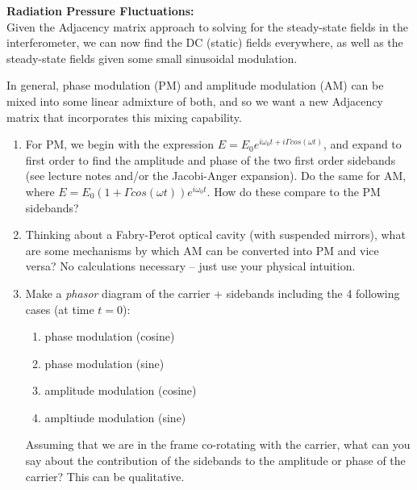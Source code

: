\item \textbf{Radiation Pressure Fluctuations:} \\

  Given the Adjacency matrix approach to solving for the steady-state fields in the interferometer, we can now find the DC (static) fields everywhere, as well as the steady-state fields given some small sinusoidal modulation.


  In general, phase modulation (PM) and amplitude modulation (AM) can be mixed into some linear admixture of both, and so we want a new Adjacency matrix that incorporates this mixing capability.

  \begin{enumerate}

  \item For PM, we begin with the expression $E = E_0 e^{i \omega_0 t + i \Gamma cos(\omega t)}$, and expand to first order to find the amplitude and phase of the two first order sidebands (see lecture notes and/or the Jacobi-Anger expansion). Do the same for AM, where $E = E_0 (1 + \Gamma cos(\omega t)) e^{i \omega_0 t}$. How do these compare to the PM sidebands?

  \item Thinking about a Fabry-Perot optical cavity (with suspended mirrors), what are some mechanisms by which AM can be converted into PM and vice versa? No calculations necessary -- just use your physical intuition.

  \item Make a \emph{phasor} diagram of the carrier + sidebands including the 4 following cases (at time $t = 0$):
     \begin{enumerate}
     \item phase modulation (cosine)
     \item phase modulation (sine)
     \item amplitude modulation (cosine)
     \item ampltiude modulation (sine)
     \end{enumerate}
  Assuming that we are in the frame co-rotating with the carrier, what can you say about the contribution of the sidebands to the amplitude or phase of the carrier? This can be qualitative.










  \end{enumerate}
